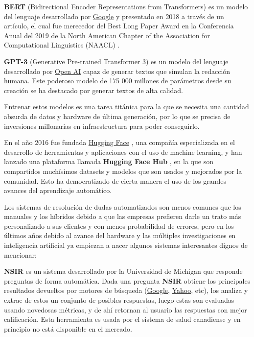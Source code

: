 \textbf{BERT} (Bidirectional Encoder Representations from Transformers) es un modelo del lenguaje desarrollado por \href{google.com}{Google} y presentado en 2018 a través de un artículo, el cual fue merecedor del Best Long Paper
Award en la Conferencia Anual del 2019 de la North American Chapter of the Association for Computational Linguistics (NAACL) \cite{bert_award}.
\newline

\textbf{GPT-3} (Generative Pre-trained Transformer 3) es un modelo del lenguaje desarrollado por \href{https://openai.com/}{Open AI} capaz de generar textos que simulan la redacción humana. Este poderoso modelo de 175 000 millones de parámetros desde su creación se ha destacado por generar textos de alta calidad.
\newline

Entrenar estos modelos es una tarea titánica para la que se necesita una cantidad absurda de datos y hardware de última generación, por lo que se precisa de inversiones millonarias en infraestructura para poder conseguirlo.
\newline

En el año 2016 fue fundada \href{https://huggingface.co/}{Hugging Face} \cite{hugging_face}, una compañía especializada en el desarrollo de herramientas y aplicaciones con el uso de machine learning, y han lanzado una plataforma llamada \textbf{Hugging Face Hub} \cite{hugging_face_hub}, en la que son compartidos muchísimos datasets y modelos que son usados y mejorados por la comunidad. Esto ha democratizado de cierta manera el uso de los grandes avances del aprendizaje automático.
\newline

Los sistemas de resolución de dudas automatizados son menos comunes que los manuales y los híbridos debido a que las empresas prefieren darle un trato más personalizado a sus clientes y con menos probabilidad de errores, pero en los últimos años debido al avance del hardware y las múltiples investigaciones en inteligencia artificial ya empiezan a nacer algunos sistemas interesantes dignos de mencionar:
\newline

\textbf{NSIR} \cite{nsir} es un sistema desarrollado por la Universidad de Michigan que responde preguntas de forma automática. Dada una pregunta \textbf{NSIR} obtiene los principales resultados devueltos por motores de búsqueda (\href{google.com}{Google}, \href{yahoo.com}{Yahoo}, etc), los analiza y extrae de estos un conjunto de posibles respuestas, luego estas son evaluadas usando novedosas métricas, y de ahí retornan al usuario las respuestas con mejor calificación. Esta herramienta es usada por el sistema de salud canadiense y en principio no está disponible en el mercado.
\newline

